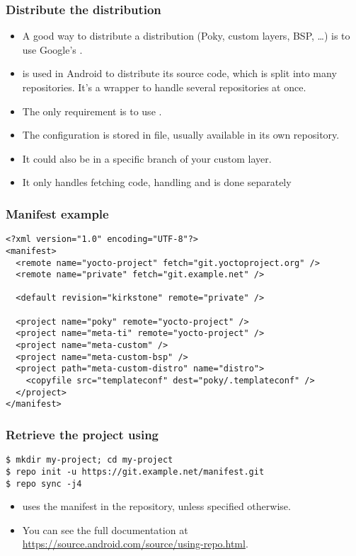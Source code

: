 \begin{frame}
  \frametitle{Distribute the distribution}
  \begin{itemize}
    \item A good way to distribute a distribution (Poky, custom
      layers, BSP, \dots) is to use Google's
      .
    \item {} is used in Android to distribute its source
      code, which is split into many  repositories. It's a
      wrapper to handle several  repositories at once.
    \item The only requirement is to use .
    \item The  configuration is stored in 
      file, usually available in its own  repository.
  \item It could also be in a specific branch of your custom layer.
  \item It only handles fetching code, handling  and
     is done separately
  \end{itemize}
\end{frame}

\begin{frame}[fragile]
  \frametitle{Manifest example}
  \begin{block}{}
  \fontsize{9}{9}\selectfont
  \begin{verbatim}
<?xml version="1.0" encoding="UTF-8"?>
<manifest>
  <remote name="yocto-project" fetch="git.yoctoproject.org" />
  <remote name="private" fetch="git.example.net" />

  <default revision="kirkstone" remote="private" />

  <project name="poky" remote="yocto-project" />
  <project name="meta-ti" remote="yocto-project" />
  <project name="meta-custom" />
  <project name="meta-custom-bsp" />
  <project path="meta-custom-distro" name="distro">
    <copyfile src="templateconf" dest="poky/.templateconf" />
  </project>
</manifest>
  \end{verbatim}
  \end{block}
\end{frame}

\begin{frame}[fragile]
  \frametitle{Retrieve the project using }
  \begin{verbatim}
$ mkdir my-project; cd my-project
$ repo init -u https://git.example.net/manifest.git
$ repo sync -j4
  \end{verbatim}
  \begin{itemize}
    \item {} uses the  manifest in the
    repository, unless specified otherwise.
    \item You can see the full  documentation at
      \url{https://source.android.com/source/using-repo.html}.
  \end{itemize}
\end{frame}

